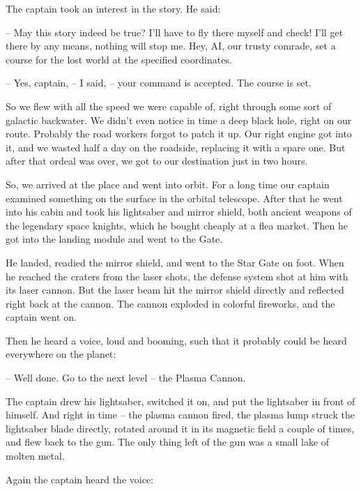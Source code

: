 \documentclass[ebook,twoside,final,openright]{memoir}
\begin{document}
\par
The captain took an interest in the story. He said:\par
– May this story indeed be true? I’ll have to fly there myself and check! I'll get there by any means, nothing will stop me. Hey, AI, our trusty comrade, set a course for the lost world at the specified coordinates.\par
– Yes, captain, – I said, – your command is accepted. The course is set.\par
So we flew with all the speed we were capable of, right through some sort of galactic backwater. We didn’t even notice in time a deep black hole, right on our route. Probably the road workers forgot to patch it up. Our right engine got into it, and we wasted half a day on the roadside, replacing it with a spare one. But after that ordeal was over, we got to our destination just in two hours.\par
\par
So, we arrived at the place and went into orbit. For a long time our captain examined something on the surface in the orbital telescope. After that he went into his cabin and took his lightsaber and mirror shield, both ancient weapons of the legendary space knights, which he bought cheaply at a flea market. Then he got into the landing module and went to the Gate.\par
\par
He landed, readied the mirror shield, and went to the Star Gate on foot. When he reached the craters from the laser shots, the defense system shot at him with its laser cannon. But the laser beam hit the mirror shield directly and reflected right back at the cannon. The cannon exploded in colorful fireworks, and the captain went on.\par
\par
Then he heard a voice, loud and booming, such that it probably could be heard everywhere on the planet:\par
– Well done. Go to the next level – the Plasma Cannon.\par
The captain drew his lightsaber, switched it on, and put the lightsaber in front of himself. And right in time – the plasma cannon fired, the plasma lump struck the lightsaber blade directly, rotated around it in its magnetic field a couple of times, and flew back to the gun. The only thing left of the gun was a small lake of molten metal.\par
\par
Again the captain heard the voice:\par
\end{document}
